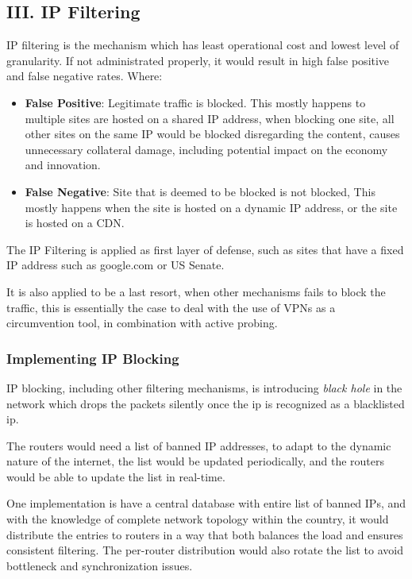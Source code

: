 \hypertarget{iii.-ip-filtering}{%
\subsection{III. IP Filtering}\label{iii.-ip-filtering}}

IP filtering is the mechanism which has least operational cost and
lowest level of granularity. \cite{07_taxonomy} If not administrated
properly, it would result in high false positive and false negative
rates. Where:

\begin{itemize}
\tightlist
\item
  \textbf{False Positive}: Legitimate traffic is blocked. This mostly
  happens to multiple sites are hosted on a shared IP address, when
  blocking one site, all other sites on the same IP would be blocked
  disregarding the content, causes unnecessary collateral damage,
  including potential impact on the economy and innovation.
\item
  \textbf{False Negative}: Site that is deemed to be blocked is not
  blocked, This mostly happens when the site is hosted on a dynamic IP
  address, or the site is hosted on a CDN.
\end{itemize}

The IP Filtering is applied as first layer of defense, such as sites
that have a fixed IP address such as google.com or US Senate.

It is also applied to be a last resort, when other mechanisms fails to
block the traffic, this is essentially the case to deal with the use of
VPNs as a circumvention tool, in combination with active probing.

\hypertarget{implementing-ip-blocking}{%
\subsubsection{Implementing IP
Blocking}\label{implementing-ip-blocking}}

IP blocking, including other filtering mechanisms, is introducing
\emph{black hole} in the network which drops the packets silently once
the ip is recognized as a blacklisted ip.

The routers would need a list of banned IP addresses, to adapt to the
dynamic nature of the internet, the list would be updated periodically,
and the routers would be able to update the list in real-time.

One implementation is have a central database with entire list of banned
IPs, and with the knowledge of complete network topology within the
country, it would distribute the entries to routers in a way that both
balances the load and ensures consistent filtering. The per-router
distribution would also rotate the list to avoid bottleneck and
synchronization issues.

